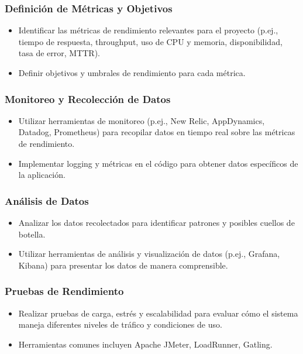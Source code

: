 \documentclass{article}
\begin{document}
\subsubsection{Definición de Métricas y Objetivos}
\begin{itemize}
    \item Identificar las métricas de rendimiento relevantes para el proyecto (p.ej., tiempo de respuesta, throughput, uso de CPU y memoria, disponibilidad, tasa de error, MTTR).
    \item Definir objetivos y umbrales de rendimiento para cada métrica.
\end{itemize}

\subsubsection{Monitoreo y Recolección de Datos}
\begin{itemize}
    \item Utilizar herramientas de monitoreo (p.ej., New Relic, AppDynamics, Datadog, Prometheus) para recopilar datos en tiempo real sobre las métricas de rendimiento.
    \item Implementar logging y métricas en el código para obtener datos específicos de la aplicación.
\end{itemize}

\subsubsection{Análisis de Datos}
\begin{itemize}
    \item Analizar los datos recolectados para identificar patrones y posibles cuellos de botella.
    \item Utilizar herramientas de análisis y visualización de datos (p.ej., Grafana, Kibana) para presentar los datos de manera comprensible.
\end{itemize}

\subsubsection{Pruebas de Rendimiento}
\begin{itemize}
    \item Realizar pruebas de carga, estrés y escalabilidad para evaluar cómo el sistema maneja diferentes niveles de tráfico y condiciones de uso.
    \item Herramientas comunes incluyen Apache JMeter, LoadRunner, Gatling.
\end{itemize}
\end{document}
